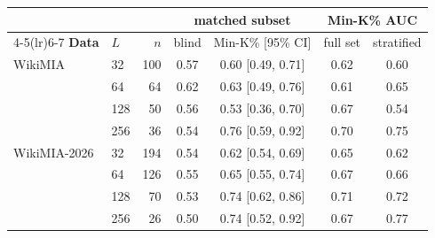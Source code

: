 \begin{tabular}{@{}llrcccc@{}}
\toprule
& & & \multicolumn{2}{c}{\textbf{matched subset}} & \multicolumn{2}{c}{\textbf{Min-K\% AUC}} \\
\cmidrule(lr){4-5}\cmidrule(lr){6-7}
\textbf{Data} & $L$ & $n$ & blind & Min-K\% [95\% CI] & full set & stratified \\
\midrule
WikiMIA & 32 & 100 & 0.57 & 0.60 [0.49, 0.71] & 0.62 & 0.60 \\
 & 64 & 64 & 0.62 & 0.63 [0.49, 0.76] & 0.61 & 0.65 \\
 & 128 & 50 & 0.56 & 0.53 [0.36, 0.70] & 0.67 & 0.54 \\
 & 256 & 36 & 0.54 & 0.76 [0.59, 0.92] & 0.70 & 0.75 \\
\addlinespace
WikiMIA-2026 & 32 & 194 & 0.54 & 0.62 [0.54, 0.69] & 0.65 & 0.62 \\
 & 64 & 126 & 0.55 & 0.65 [0.55, 0.74] & 0.67 & 0.66 \\
 & 128 & 70 & 0.53 & 0.74 [0.62, 0.86] & 0.71 & 0.72 \\
 & 256 & 26 & 0.50 & 0.74 [0.52, 0.92] & 0.67 & 0.77 \\
\bottomrule
\end{tabular}
